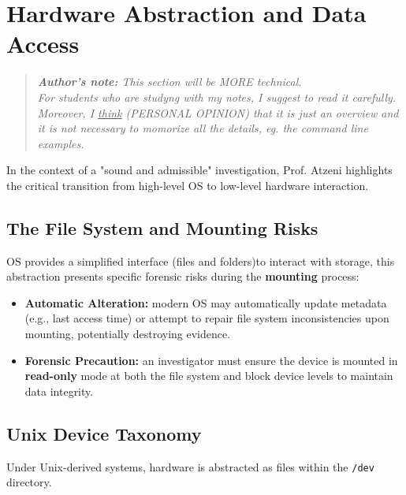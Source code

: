 \section{Hardware Abstraction and Data Access}

\begin{quotation}
    \textit{\textbf{Author's note:} This section will be MORE technical.\\
    For students who are studyng with my notes, I suggest to read it carefully.\\
    Moreover, I \underline{think} (PERSONAL OPINION) that it is just an overview and it is not necessary to momorize all the details, eg. the command line examples.} 
\end{quotation}

\noindent
In the context of a "sound and admissible" investigation, Prof. Atzeni highlights the critical transition from high-level OS to low-level hardware interaction.

\subsection{The File System and Mounting Risks}
OS provides a simplified interface (files and folders)to interact with storage, this abstraction presents specific forensic risks during the \textbf{mounting} process:
\begin{itemize}
    \item \textbf{Automatic Alteration:} modern OS may automatically update metadata (e.g., last access time) or attempt to repair file system inconsistencies upon mounting, potentially destroying evidence.
    \item \textbf{Forensic Precaution:} an investigator must ensure the device is mounted in \textbf{read-only} mode at both the file system and block device levels to maintain data integrity.
\end{itemize}

\subsection{Unix Device Taxonomy}
Under Unix-derived systems, hardware is abstracted as files within the \texttt{/dev} directory.

